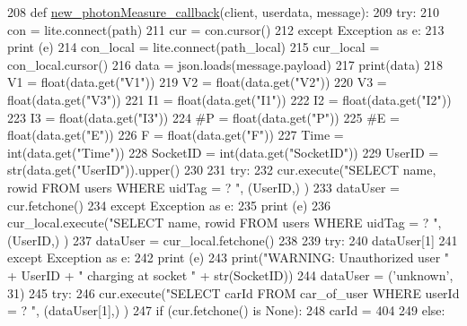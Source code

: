 \begin{DoxyCode}
208 \textcolor{keyword}{def }\hyperlink{namespace_s_q_lfunction_a356dd5906768f7dd778408f466e9f9b4}{new\_photonMeasure\_callback}(client, userdata, message):
209     \textcolor{keywordflow}{try}:
210         con = lite.connect(path)
211         cur = con.cursor()
212     \textcolor{keywordflow}{except} Exception \textcolor{keyword}{as} e:
213         \textcolor{keywordflow}{print} (e)
214     con\_local = lite.connect(path\_local)
215     cur\_local = con\_local.cursor()
216     data = json.loads(message.payload)    
217     print(data)
218     V1 = float(data.get(\textcolor{stringliteral}{"V1"}))
219     V2 = float(data.get(\textcolor{stringliteral}{"V2"}))
220     V3 = float(data.get(\textcolor{stringliteral}{"V3"}))
221     I1 = float(data.get(\textcolor{stringliteral}{"I1"}))
222     I2 = float(data.get(\textcolor{stringliteral}{"I2"}))
223     I3 = float(data.get(\textcolor{stringliteral}{"I3"}))
224     \textcolor{comment}{#P = float(data.get("P"))}
225     \textcolor{comment}{#E = float(data.get("E"))}
226     F = float(data.get(\textcolor{stringliteral}{"F"}))
227     Time = int(data.get(\textcolor{stringliteral}{"Time"}))
228     SocketID = int(data.get(\textcolor{stringliteral}{"SocketID"}))
229     UserID = str(data.get(\textcolor{stringliteral}{"UserID"})).upper()
230     
231     \textcolor{keywordflow}{try}:
232         cur.execute(\textcolor{stringliteral}{"SELECT name, rowid FROM users WHERE uidTag = ? "}, (UserID,) )
233         dataUser = cur.fetchone()
234     \textcolor{keywordflow}{except} Exception \textcolor{keyword}{as} e:
235         \textcolor{keywordflow}{print} (e)
236         cur\_local.execute(\textcolor{stringliteral}{"SELECT name, rowid FROM users WHERE uidTag = ? "}, (UserID,) )
237         dataUser = cur\_local.fetchone()
238         
239     \textcolor{keywordflow}{try}:
240         dataUser[1]
241     \textcolor{keywordflow}{except} Exception \textcolor{keyword}{as} e:
242         \textcolor{keywordflow}{print} (e)
243         print(\textcolor{stringliteral}{"WARNING: Unauthorized user "} + UserID + \textcolor{stringliteral}{" charging at socket "} + str(SocketID))
244         dataUser = (\textcolor{stringliteral}{'unknown'}, 31)                
245     \textcolor{keywordflow}{try}:
246         cur.execute(\textcolor{stringliteral}{"SELECT carId FROM car\_of\_user WHERE userId = ? "}, (dataUser[1],) )
247         \textcolor{keywordflow}{if} (cur.fetchone() \textcolor{keywordflow}{is} \textcolor{keywordtype}{None}):
248             carId = 404
249         \textcolor{keywordflow}{else}:

\end{DoxyCode}
